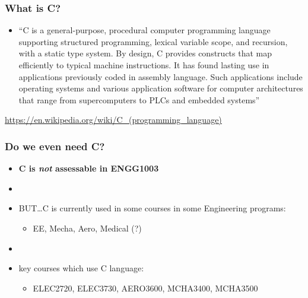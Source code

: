 \documentclass[english,14pt]{beamer}
\begin{document}

\begin{frame}[fragile]

\frametitle{What is C?}

\begin{itemize}
	\item ``C is a general-purpose, procedural computer programming language supporting structured programming, lexical variable scope, and recursion, with a static type system. By design, C provides constructs that map efficiently to typical machine instructions. It has found lasting use in applications previously coded in assembly language. Such applications include operating systems and various application software for computer architectures that range from supercomputers to PLCs and embedded systems''
\end{itemize}

\href{https://en.wikipedia.org/wiki/C_(programming_language)}{https://en.wikipedia.org/wiki/C\_(programming\_language)}

\end{frame}


\begin{frame}[fragile]

\frametitle{Do we even need C?}

\begin{itemize}
	\item \textbf{C is \emph{not} assessable in ENGG1003}
	
	\item[]
	
	\item BUT\ldots C is currently used in some courses in some Engineering programs:
	\begin{itemize}
		\item EE, Mecha, Aero, Medical (?)
	\end{itemize}
	
	\item[]
	\item key courses which use C language:
	\begin{itemize}
		\item ELEC2720, ELEC3730, AERO3600, MCHA3400, MCHA3500
	\end{itemize}

\end{itemize}
\end{frame}
\end{document}
